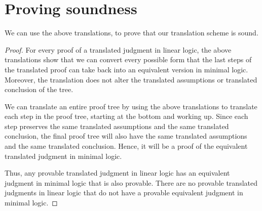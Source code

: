 \documentclass[../../../main.tex]{subfiles}
\begin{document}


\section{Proving soundness}

We can use the above translations, to prove that our translation scheme is sound.

\begin{proof}
For every proof of a translated judgment in linear logic, the above translations show that we can convert every possible form that the last steps of the translated proof can take back into an equivalent version in minimal logic. Moreover, the translation does not alter the translated assumptions or translated conclusion of the tree.

We can translate an entire proof tree by using the above translations to translate each step in the proof tree, starting at the bottom and working up. Since each step preserves the same translated assumptions and the same translated conclusion, the final proof tree will also have the same translated assumptions and the same translated conclusion. Hence, it will be a proof of the equivalent translated judgment in minimal logic.

Thus, any provable translated judgment in linear logic has an equivalent judgment in minimal logic that is also provable. There are no provable translated judgments in linear logic that do not have a provable equivalent judgment in minimal logic.
\end{proof}
\end{document}
